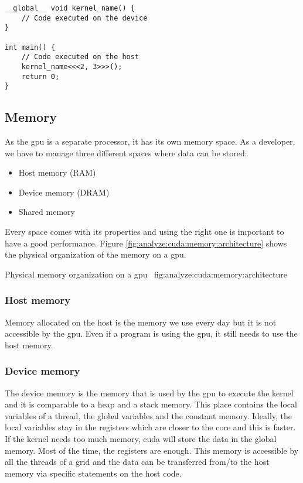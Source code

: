 \begin{code}
    \label{code:analyze:cuda:basis:kernel}
    \begin{verbatim}
__global__ void kernel_name() {
    // Code executed on the device
}

int main() {
    // Code executed on the host
    kernel_name<<<2, 3>>>();
    return 0;
}
    \end{verbatim}
\end{code}

\subsection{Memory}
\label{ch:analyze:cuda:memory}

As the \acrshort{gpu} is a separate processor, it has its own memory space.
As a developer, we have to manage three different spaces where data can be stored:
\begin{itemize}
    \item Host memory (RAM)
    \item Device memory (DRAM)
    \item Shared memory
\end{itemize}

Every space comes with its properties and using the right one is important to
have a good performance.
Figure \ref{fig:analyze:cuda:memory:architecture} shows the physical
organization of the memory on a \acrshort{gpu}.

{Physical memory organization on a \acrshort{gpu}~\cite{cuda-training}}
{fig:analyze:cuda:memory:architecture}


\subsubsection{Host memory}
\label{ch:analyze:cuda:memory:host}

Memory allocated on the host is the memory we use every day but it is not
accessible by the \acrshort{gpu}.
Even if a program is using the \acrshort{gpu}, it still needs to use the host
memory.

\subsubsection{Device memory}
\label{ch:analyze:cuda:memory:device}

The device memory is the memory that is used by the \acrshort{gpu} to execute
the kernel and it is comparable to a heap and a stack memory.
This place contains the local variables of a thread, the global variables and
the constant memory.
Ideally, the local variables stay in the registers which are closer to the core
and this is faster.
If the kernel needs too much memory, \acrshort{cuda} will store the data in the
global memory.
Most of the time, the registers are enough.
This memory is accessible by all the threads of a grid and the data can be
transferred from/to the host memory via specific statements on the host code.

